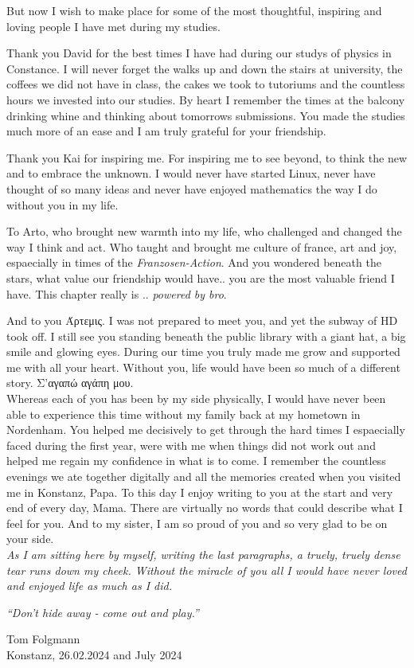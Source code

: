 But now I wish to make place for some of the most thoughtful, inspiring and loving people I have met during my studies. 

Thank you David for the best times I have had during our studys of physics in Constance. I will never forget the walks up and down the stairs at university, the coffees we did not have in class, the cakes we took to tutoriums and the countless hours we invested into our studies. By heart I remember the times at the balcony drinking whine and thinking about tomorrows submissions. You made the studies much more of an ease and I am truly grateful for your friendship.  

Thank you Kai for inspiring me. For inspiring me to see beyond, to think the new and to embrace the unknown. I would never have started Linux, never have thought of so many ideas and never have enjoyed mathematics the way I do without you in my life. 

To Arto, who brought new warmth into my life, who challenged and changed the way I think and act. Who taught and brought me culture of france, art and joy, espaecially in times of the \emph{Franzosen-Action}. And you wondered beneath the stars, what value our friendship would have.. you are the most valuable friend I have. This chapter really is .. \emph{powered by bro}.

And to you \textgreek{Άρτεμις}. I was not prepared to meet you, and yet the subway of HD took off. I still see you standing beneath the public library with a giant hat, a big smile and glowing eyes. During our time you truly made me grow and supported me with all your heart. Without you, life would have been so much of a different story. \textgreek{Σ'αγαπώ αγάπη μου}. \\


Whereas each of you has been by my side physically, I would have never been able to experience this time without my family back at my hometown in Nordenham. You helped me decisively to get through the hard times I espaecially faced during the first year, were with me when things did not work out and helped me regain my confidence in what is to come. I remember the countless evenings we ate together digitally and all the memories created when you visited me in Konstanz, Papa. To this day I enjoy writing to you at the start and very end of every day, Mama. There are virtually no words that could describe what I feel for you. And to my sister, I am so proud of you and so very glad to be on your side. \\

\textit{As I am sitting here by myself, writing the last paragraphs, a truely, truely dense tear runs down my cheek. Without the miracle of you all I would have never loved and enjoyed life as much as I did.}

\begin{center}
    \slshape
    \enquote{Don't hide away - come out and play.}
\end{center}

\vspace{2cm}
\noindent Tom Folgmann\\
\noindent Konstanz, 26.02.2024 and July 2024
